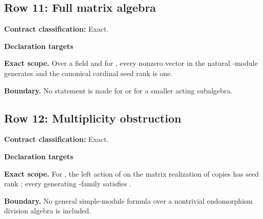 \subsection{Row 11: Full matrix algebra}
\label{row:11}
\textbf{Contract classification:} Exact.
\par\smallskip\textbf{Declaration targets}\par
{\small\noindent{}\par}
{\small\noindent{}\par}
\medskip\noindent\textbf{Exact scope.} Over a field and for , every nonzero vector in the natural -module generates and the canonical cardinal seed rank is one.
\par\smallskip\noindent\textbf{Boundary.} No statement is made for  or for a smaller acting subalgebra.
\medskip
\subsection{Row 12: Multiplicity obstruction}
\label{row:12}
\textbf{Contract classification:} Exact.
\par\smallskip\textbf{Declaration targets}\par
{\small\noindent{}\par}
{\small\noindent{}\par}
\medskip\noindent\textbf{Exact scope.} For , the left action of  on the  matrix realization of  copies has seed rank ; every generating -family satisfies .
\par\smallskip\noindent\textbf{Boundary.} No general simple-module formula over a nontrivial endomorphism division algebra is included.
\medskip
